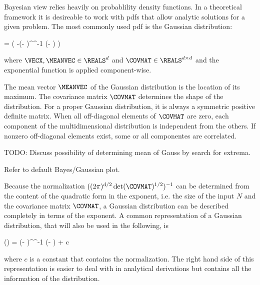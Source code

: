 \stopsection

\startsection[title=The Multivariate Gaussian Distribution]

    Bayesian view relies heavily on probablility density functions. In
    a theoretical framework it is desireable to work with pdfs that allow
    analytic solutions for a given problem. The most commonly used pdf is the
    Gaussian distribution:

    \placeformula[eq:gaussian]
    \startformula
        \GAUSS{\VECX}{\MEANVEC}{\COVMAT}
        = 
          \exp \left( -(\VECX - \MEANVEC)^\top \COVMAT^{-1} (\VECX - \MEANVEC) \right)
    \stopformula

    where $\VECX, \MEANVEC \in \REALS^d$ and $\COVMAT \in \REALS^{d \times d}$
    and the exponential function is applied component-wise.

    The mean vector $\MEANVEC$ of the Gaussian distribution is the location of
    its maximum. The covariance matrix $\COVMAT$ determines the shape of the
    distribution. For a proper Gaussian distribution, it is always a symmetric
    positive definite matrix. When all off-diagonal elements of $\COVMAT$ are
    zero, each component of the multidimensional distribution is independent
    from the others. If nonzero off-diagonal elements exist, some or all
    componentes are correlated.

    TODO: Discuss possibility of determining mean of Gauss by search for extrema.

    Refer to default Bayes/Gaussian plot.

    Because the normalization $((2 \pi)^{d/2} \det(\COVMAT)^{1/2})^{-1}$ can be
    determined from the content of the quadratic form in the exponent, i.e. the
    size of the input $N$ and the covariance matrix $\COVMAT$, a Gaussian
    distribution can be described completely in terms of the exponent.
    A common representation of a Gaussian distribution, that will also be used
    in the following, is

     \ln(\GAUSS{\VECX}{\MEANVEC}{\COVMAT})
        = (\VECX - \MEANVEC)^\top \COVMAT^{-1} (\VECX - \MEANVEC) + c \EQCOMMA %
    \stopformula

    where $c$ is a constant that contains the normalization. The right hand
    side of this representation is easier to deal with in analytical
    derivations but contains all the information of the distribution.

